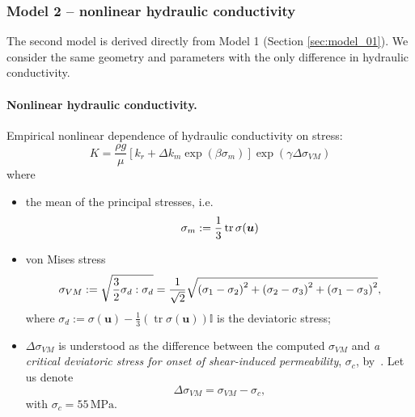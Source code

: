 \documentclass{article}
\def\unit#1{\mathrm{#1}}
\def\tr{\operatorname{tr}}
\def\vc#1{\mathbf{\boldsymbol{#1}}}     %
\def\tn#1{{\mathbb{#1}}}    %
\def\sqr#1{{{\left(#1\right)}^2}}    %
\def\uu{\vc u}
\newcommand{\eq}[1]{\begin{equation}{#1}\end{equation}}
\newcommand\figref[1]{Figure~\ref{#1}}
\newcommand\tabref[1]{Table~\ref{#1}}
\begin{document}
\subsubsection{Model 2 -- nonlinear hydraulic conductivity}
The second model is derived directly from Model 1 (Section \ref{sec:model_01}).
We consider the same geometry and parameters with the only difference in hydraulic conductivity.

\paragraph{Nonlinear hydraulic conductivity.}
Empirical nonlinear dependence of hydraulic conductivity on stress:
\eq{ K = \frac{\rho g}{\mu} \left[k_r + \Delta k_m\exp(\beta\sigma_m)\right]\exp(\gamma\Delta\sigma_{VM}) }
where
\begin{itemize}
    \item the mean of the principal stresses, i.e.
        \eq{\label{eq:mean_stress} \sigma_m:=\frac13\tr\tn\sigma(\uu)}
    \item von Mises stress
        \eq{\label{eq:von_mises} \sigma_{VM}:=\sqrt{\frac32\tn\sigma_d:\tn\sigma_d} 
            = \frac{1}{\sqrt{2}}\sqrt{\sqr{\sigma_1-\sigma_2}+\sqr{\sigma_2-\sigma_3}+\sqr{\sigma_1-\sigma_3}},}
        where $\tn\sigma_d:=\tn\sigma(\uu)-\frac13(\tr\tn\sigma(\uu))\tn I$ is the deviatoric stress;
    \item $\Delta\sigma_{VM}$ is understood as the difference between the computed $\sigma_{VM}$ and
        \emph{a critical deviatoric stress for onset of shear-induced permeability}, $\sigma_{c}$, by~\cite{rutqvist_fractured_2015}.
        Let us denote
        \eq{\Delta\sigma_{VM} = \sigma_{VM} - \sigma_{c},}
        with $\sigma_{c}=55\,\unit{MPa}$.
\end{itemize}

\end{document}
